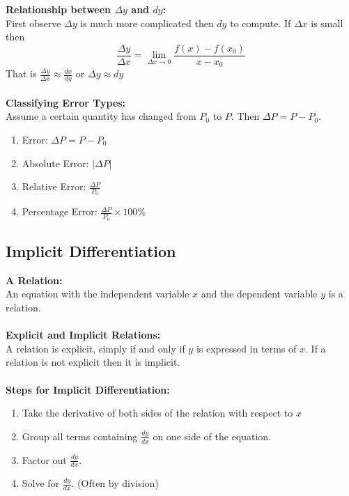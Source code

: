 \documentclass[14pt]{article}
\begin{document}
    \textbf{Relationship between $\Delta y$ and $dy$:}\\
    First observe $\Delta y$ is much more complicated then $dy$ to compute. If $\Delta x$ is small then $$\frac{\Delta y}{\Delta x}=\lim \limits_{\Delta x\rightarrow 0}\frac{f(x)-f(x_0)}{x-x_0}$$
    That is $\frac{\Delta y}{\Delta x}\approx\frac{dx}{dy}$ or $\Delta y\approx dy$\\\\
    \textbf{Classifying Error Types:}\\
    Assume a certain quantity has changed from $P_0$ to $P$. Then $\Delta P= P-P_0$.
    \begin{enumerate}
        \item Error: $\Delta P=P-P_0$
        \item Absolute Error: $|\Delta P|$
        \item Relative Error: $\frac{\Delta P}{P_0}$
        \item Percentage Error: $\frac{\Delta P}{P_0}\times 100\% $ 
    \end{enumerate}
    \subsection{Implicit Differentiation}
    \textbf{A Relation:}\\
    An equation with the independent variable $x$ and the dependent variable $y$ is a relation.\\\\
    \textbf{Explicit and Implicit Relations:}\\
    A relation is explicit, simply if and only if $y$ is expressed in terms of $x$. If a relation is not explicit then it is implicit.\\\\
    \textbf{Steps for Implicit Differentiation:}\\
    \begin{enumerate}
        \item Take the derivative of both sides of the relation with respect to $x$
        \item Group all terms containing $\frac{dy}{dx}$ on one side of the equation.
        \item Factor out $\frac{dy}{dx}$.
        \item Solve for $\frac{dy}{dx}$. (Often by division)
    \end{enumerate}
\end{document}
